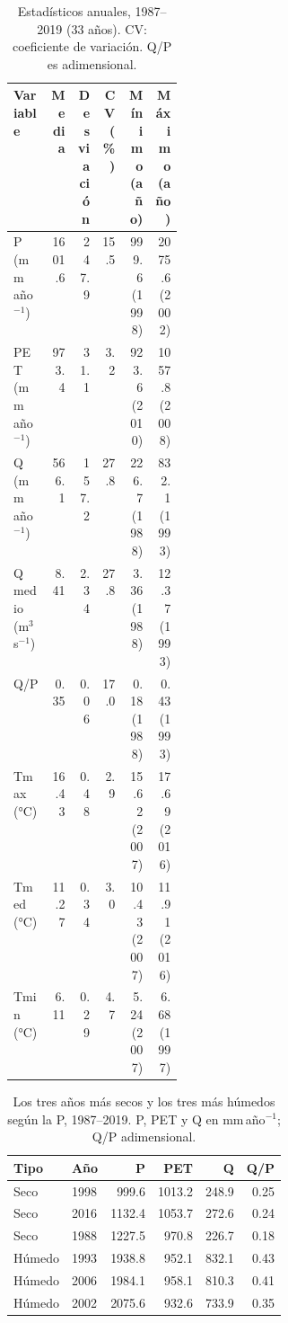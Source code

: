 \begin{table}[ht]
\centering
\caption{Estadísticos anuales, 1987--2019 (33 años). CV: coeficiente de
variación. Q/P es adimensional.}
\label{tab:E04estadisticos}
\begin{tabular}{|p{0.22\linewidth}|r|r|r|r|r|}
\hline
Variable & Media & Desviación & CV (\%) & Mínimo (año) & Máximo (año) \\
\hline
P (mm\,año$^{-1}$) & 1601.6 & 247.9 & 15.5 & 999.6 (1998) & 2075.6 (2002) \\
\hline
PET (mm\,año$^{-1}$) & 973.4 & 31.1 & 3.2 & 923.6 (2010) & 1057.8 (2008) \\
\hline
Q (mm\,año$^{-1}$) & 566.1 & 157.2 & 27.8 & 226.7 (1988) & 832.1 (1993) \\
\hline
Q medio (m$^3$\,s$^{-1}$) & 8.41 & 2.34 & 27.8 & 3.36 (1988) & 12.37 (1993) \\
\hline
Q/P & 0.35 & 0.06 & 17.0 & 0.18 (1988) & 0.43 (1993) \\
\hline
Tmax (°C) & 16.43 & 0.48 & 2.9 & 15.62 (2007) & 17.69 (2016) \\
\hline
Tmed (°C) & 11.27 & 0.34 & 3.0 & 10.43 (2007) & 11.91 (2016) \\
\hline
Tmin (°C) & 6.11 & 0.29 & 4.7 & 5.24 (2007) & 6.68 (1997) \\
\hline
\end{tabular}
\end{table}

\begin{table}[ht]
\centering
\caption{Los tres años más secos y los tres más húmedos según la P,
1987--2019. P, PET y Q en mm\,año$^{-1}$; Q/P adimensional.}
\label{tab:E04extremos}
\begin{tabular}{|l|l|r|r|r|r|}
\hline
Tipo & Año & P & PET & Q & Q/P \\
\hline
Seco & 1998 & 999.6 & 1013.2 & 248.9 & 0.25 \\
\hline
Seco & 2016 & 1132.4 & 1053.7 & 272.6 & 0.24 \\
\hline
Seco & 1988 & 1227.5 & 970.8 & 226.7 & 0.18 \\
\hline
Húmedo & 1993 & 1938.8 & 952.1 & 832.1 & 0.43 \\
\hline
Húmedo & 2006 & 1984.1 & 958.1 & 810.3 & 0.41 \\
\hline
Húmedo & 2002 & 2075.6 & 932.6 & 733.9 & 0.35 \\
\hline
\end{tabular}
\end{table}

